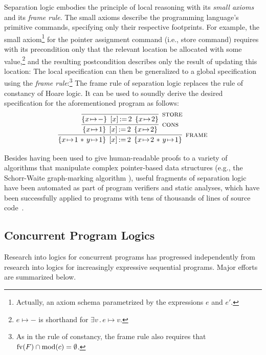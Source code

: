 \documentclass[11pt]{report}
\begin{document}
Separation logic embodies the principle of local reasoning with its \emph{small axioms} and its \emph{frame rule}. The small axioms describe the programming language's primitive commands, specifying only their respective footprints. For example, the small axiom\footnote{Actually, an axiom schema parametrized by the expressions $e$ and $e'$.} for the pointer assignment command (i.e., store command) requires with its precondition only that the relevant location be allocated with some value,\footnote{$e \mapsto -$ is shorthand for $\exists v\,.\,e \mapsto v$.} and the resulting postcondition describes only the result of updating this location:  The local specification can then be generalized to a global specification using the \emph{frame rule}:\footnote{As in the rule of constancy, the frame rule also requires that $\mathrm{fv}(F) \cap \mathrm{mod}(c) = \operatorname{\emptyset}$.}   The frame rule of separation logic replaces the rule of constancy of Hoare logic. It can be used to soundly derive the desired specification for the aforementioned program as follows: \[ \infer[\textsc{frame}]{\htriple{x \fpointsto 1 \fsep y \fpointsto 1}{\cstore{x}{2}}{x \fpointsto 2 \fsep y \fpointsto 1}}{\infer[\textsc{cons}]{\htriple{x \fpointsto 1}{\cstore{x}{2}}{x \fpointsto 2}}{\infer[\textsc{store}]{\htriple{x \fpointsto - }{\cstore{x}{2}}{x \fpointsto 2}}{}}}\]

Besides having been used to give human-readable proofs to a variety of algorithms that manipulate complex pointer-based data structures (e.g., the Schorr-Waite graph-marking algorithm \cite{Yang-thesis}), useful fragments of separation logic have been automated as part of program verifiers and static analyses, which have been successfully applied to programs with tens of thousands of lines of source code~\cite{DBLP:conf/fmco/BerdineCO05,DBLP:conf/cav/YangLBCCDO08,DBLP:conf/cav/BerdineCI11}.

\subsection{Concurrent Program Logics}

Research into logics for concurrent programs has progressed independently from research into logics for increasingly expressive sequential programs. Major efforts are summarized below. 
\end{document}
